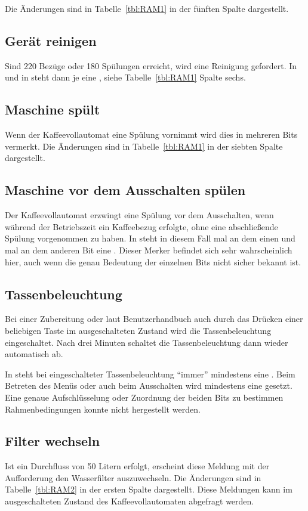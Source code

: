 Die Änderungen sind in Tabelle~\ref{tbl:RAM1} in der fünften Spalte dargestellt.

\subsection{Gerät reinigen}
Sind 220 Bezüge oder 180 Spülungen erreicht, wird eine Reinigung gefordert.
In  und in  steht dann je eine , siehe Tabelle~\ref{tbl:RAM1} Spalte sechs.

\subsection{Maschine spült}
Wenn der Kaffeevollautomat eine Spülung vornimmt wird dies in mehreren Bits vermerkt.
Die Änderungen sind in Tabelle~\ref{tbl:RAM1} in der siebten Spalte dargestellt.

\subsection{Maschine vor dem Ausschalten spülen}
Der Kaffeevollautomat erzwingt eine Spülung vor dem Ausschalten, wenn während der Betriebszeit ein Kaffeebezug erfolgte, ohne eine abschließende Spülung vorgenommen zu haben.
In  steht in diesem Fall mal an dem einen und mal an dem anderen Bit eine .
Dieser Merker befindet sich sehr wahrscheinlich hier, auch wenn die genau Bedeutung der einzelnen Bits nicht sicher bekannt ist.

\subsection{Tassenbeleuchtung}
Bei einer Zubereitung oder laut Benutzerhandbuch auch durch das Drücken einer beliebigen Taste im ausgeschalteten Zustand wird die Tassenbeleuchtung eingeschaltet.
Nach drei Minuten schaltet die Tassenbeleuchtung dann wieder automatisch ab.

In  steht bei eingeschalteter Tassenbeleuchtung "`immer"' mindestens eine .
Beim Betreten des Menüs oder auch beim Ausschalten wird mindestens eine  gesetzt.
Eine genaue Aufschlüsselung oder Zuordnung der beiden Bits zu bestimmen Rahmenbedingungen konnte nicht hergestellt werden.

\subsection{Filter wechseln}
Ist ein Durchfluss von 50 Litern erfolgt, erscheint diese Meldung mit der Aufforderung den Wasserfilter auszuwechseln.
Die Änderungen sind in Tabelle~\ref{tbl:RAM2} in der ersten Spalte dargestellt.
Diese Meldungen kann im ausgeschalteten Zustand des Kaffeevollautomaten abgefragt werden.

